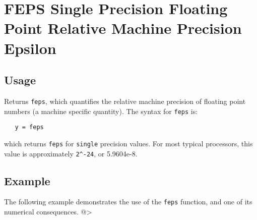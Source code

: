 \section{FEPS Single Precision Floating Point Relative Machine Precision Epsilon}

\subsection{Usage}

Returns \verb|feps|, which quantifies the relative machine precision
of floating point numbers (a machine specific quantity).  The syntax
for \verb|feps| is:
\begin{verbatim}
   y = feps
\end{verbatim}
which returns \verb|feps| for \verb|single| precision values. For most
typical processors, this value is approximately \verb|2^-24|, or 5.9604e-8.
\subsection{Example}

The following example demonstrates the use of the \verb|feps| function,
and one of its numerical consequences.
@>
